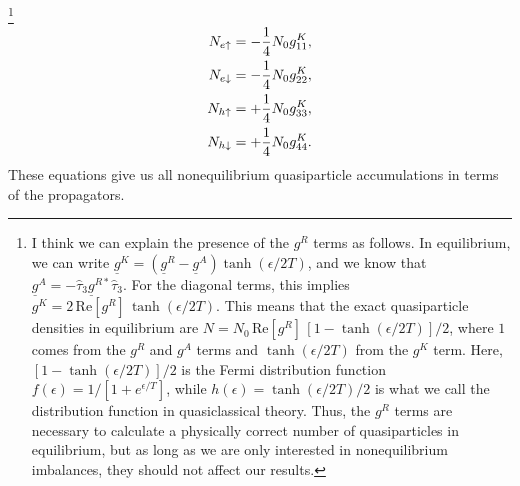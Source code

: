 \footnote{I think we can explain the presence of the $g^R$ terms as follows.
  In equilibrium, we can write $\underline{g}^K = (\underline{g}^R - \underline{g}^A) \tanh(\epsilon/2T)$, and we know that $\underline{g}^A = -\hat{\tau}_3 \underline{g}^{R\ast} \hat{\tau}_3$.
  For the diagonal terms, this implies $g^K = 2\,\text{Re}[g^R]\,\tanh(\epsilon/2T)$. 
  This means that the exact quasiparticle densities in equilibrium are $N = N_0\,\text{Re}[g^R]\,[1-\tanh(\epsilon/2T)]/2$, where $1$ comes from the $g^R$ and $g^A$ terms and $\tanh(\epsilon/2T)$ from the $g^K$ term.
  Here, $[1-\tanh(\epsilon/2T)]/2$ is the Fermi distribution function $f(\epsilon)=1/[1+e^{\epsilon/T}]$, while $h(\epsilon)=\tanh(\epsilon/2T)/2$ is what we call the distribution function in quasiclassical theory.
  Thus, the $g^R$ terms are necessary to calculate a physically correct number of quasiparticles in equilibrium, but as long as we are only interested in nonequilibrium imbalances, they should not affect our results.}%
\begin{align}
  N_{e\uparrow} &= -\frac{1}{4}N_0 g^K_{11}, \\
  N_{e\downarrow} &= -\frac{1}{4}N_0 g^K_{22}, \\
  N_{h\uparrow} &= +\frac{1}{4}N_0 g^K_{33}, \\
  N_{h\downarrow} &= +\frac{1}{4}N_0 g^K_{44}.
\end{align}
These equations give us all nonequilibrium quasiparticle accumulations in terms of the propagators.

